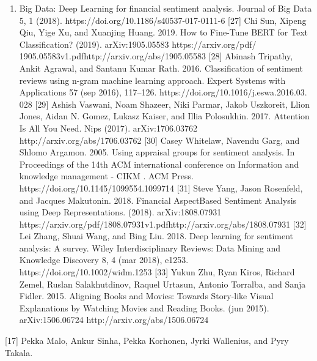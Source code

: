 \begin{enumerate}
\def\labelenumi{\arabic{enumi}.}
\setcounter{enumi}{2017}
\item
  Big Data: Deep Learning for financial sentiment analysis. Journal of Big Data 5, 1 (2018). https://doi.org/10.1186/s40537-017-0111-6 {[}27{]} Chi Sun, Xipeng Qiu, Yige Xu, and Xuanjing Huang. 2019. How to Fine-Tune BERT for Text Classification? (2019). arXiv:1905.05583 https://arxiv.org/pdf/ 1905.05583v1.pdfhttp://arxiv.org/abs/1905.05583 {[}28{]} Abinash Tripathy, Ankit Agrawal, and Santanu Kumar Rath. 2016. Classification of sentiment reviews using n-gram machine learning approach. Expert Systems with Applications 57 (sep 2016), 117--126. https://doi.org/10.1016/j.eswa.2016.03. 028 {[}29{]} Ashish Vaswani, Noam Shazeer, Niki Parmar, Jakob Uszkoreit, Llion Jones, Aidan N. Gomez, Lukasz Kaiser, and Illia Polosukhin. 2017. Attention Is All You Need. Nips (2017). arXiv:1706.03762 http://arxiv.org/abs/1706.03762 {[}30{]} Casey Whitelaw, Navendu Garg, and Shlomo Argamon. 2005. Using appraisal groups for sentiment analysis. In Proceedings of the 14th ACM international conference on Information and knowledge management - CIKM . ACM Press. https://doi.org/10.1145/1099554.1099714 {[}31{]} Steve Yang, Jason Rosenfeld, and Jacques Makutonin. 2018. Financial AspectBased Sentiment Analysis using Deep Representations. (2018). arXiv:1808.07931 https://arxiv.org/pdf/1808.07931v1.pdfhttp://arxiv.org/abs/1808.07931 {[}32{]} Lei Zhang, Shuai Wang, and Bing Liu. 2018. Deep learning for sentiment analysis: A survey. Wiley Interdisciplinary Reviews: Data Mining and Knowledge Discovery 8, 4 (mar 2018), e1253. https://doi.org/10.1002/widm.1253 {[}33{]} Yukun Zhu, Ryan Kiros, Richard Zemel, Ruslan Salakhutdinov, Raquel Urtasun, Antonio Torralba, and Sanja Fidler. 2015. Aligning Books and Movies: Towards Story-like Visual Explanations by Watching Movies and Reading Books. (jun 2015). arXiv:1506.06724 http://arxiv.org/abs/1506.06724
\end{enumerate}

{[}17{]} Pekka Malo, Ankur Sinha, Pekka Korhonen, Jyrki Wallenius, and Pyry Takala.

